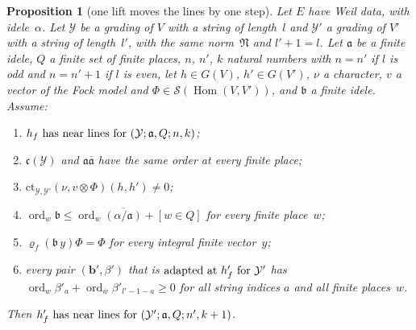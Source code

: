 \documentclass[11pt,a4paper]{article}
\newcommand{\Hom}{\operatorname{Hom}}
\newcommand{\m}[1]{\mbox{$#1$}}        %
\theoremstyle{plainx}
\newtheorem{proposition}[theorem]{Proposition}
\theoremstyle{uprightx}
\newcommand{\cj}[1]{\overline{#1}}
\newcommand{\ord}{\operatorname{ord}}
\newcommand{\tensor}{\otimes}
\newcommand{\cst}[1]{\mathfrak{c}(#1)}             %
\begin{document}
\begin{proposition}[one lift moves the lines by one step]\label{p:step}
Let $E$ have Weil data, with idele~$\alpha$. Let $\mathcal{Y}$ be a grading of $V$ with a string of length~$l$ and
$\mathcal{Y}'$ a grading of $V'$ with a string of length~$l'$, with the same norm~$\mathfrak{N}$ and \m{l'+1=l}. Let
$\mathfrak{a}$ be a finite idele, $Q$ a finite set of finite places, $n$, $n'$, $k$ natural numbers with \m{n=n'} if
$l$ is odd and \m{n=n'+1} if $l$ is even, let \m{h\in G(V)}, \m{h'\in G(V')}, $\nu$ a character, $v$ a vector of the
Fock model and $\Phi\in\mathcal{S}(\Hom(V,V'))$, and $\mathfrak{b}$ a finite idele. Assume:
\begin{enumerate}[label=(\alph*)]
\item $\near{\mathcal{Y}}{\mathfrak{a}}{Q}{n}{k}{h_f}$;
\item \m{\cst{\mathcal{Y}}} and \m{\mathfrak{a}\cj{\mathfrak{a}}} have the same order at every finite place;
\item $\mathrm{ct}_{\mathcal{Y},\mathcal{Y}'}(\nu,v\tensor\Phi)(h,h')\ne0$;
\item $\ord_w\mathfrak{b}\le\ord_w\cj{(\alpha/\mathfrak{a})}+[w\in Q]$ for every finite place~$w$;
\item $\varrho_f(\mathfrak{b}\,y)\Phi=\Phi$ for every integral finite vector~$y$;
\item every pair $(\mathbf{b}',\beta')$ that is $\adat{\mathcal{Y}'}{h'_f}$ has
  $\ord_w\beta'_a+\ord_{\cj w}\beta'_{l'-1-a}\ge0$ for all string indices $a$ and all finite places~$w$.
\end{enumerate}
Then $\near{\mathcal{Y}'}{\mathfrak{a}}{Q}{n'}{k+1}{h'_f}$.
\end{proposition}
\end{document}
